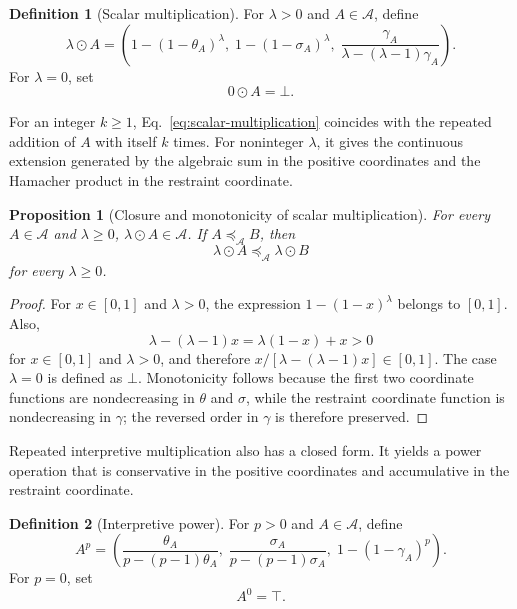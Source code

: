 \documentclass[reqno,final]{amsart}
\theoremstyle{definition}
\newtheorem{definition}{Definition}
\theoremstyle{plain}
\newtheorem{proposition}{Proposition}
\theoremstyle{remark}
\providecommand{\cA}{\mathcal{A}}
\providecommand{\preceqA}{\preceq_{\mathcal A}}
\begin{document}
\begin{definition}[Scalar multiplication]
\label{def:scalar-multiplication}
For \(\lambda>0\) and \(A\in\cA\), define
\begin{equation}
\lambda\odot A
=
\left(
1-(1-\theta_A)^\lambda,
\;1-(1-\sigma_A)^\lambda,
\;\frac{\gamma_A}{\lambda-(\lambda-1)\gamma_A}
\right).
\label{eq:scalar-multiplication}
\end{equation}
For \(\lambda=0\), set
\[
0\odot A=\bot.
\]
\end{definition}

For an integer \(k\ge1\), Eq.~\eqref{eq:scalar-multiplication} coincides with the repeated addition of \(A\) with itself \(k\) times. For noninteger \(\lambda\), it gives the continuous extension generated by the algebraic sum in the positive coordinates and the Hamacher product in the restraint coordinate.

\begin{proposition}[Closure and monotonicity of scalar multiplication]
\label{prop:scalar-multiplication-closure}
For every \(A\in\cA\) and \(\lambda\ge0\), \(\lambda\odot A\in\cA\). If \(A\preceqA B\), then
\[
\lambda\odot A\preceqA \lambda\odot B
\]
for every \(\lambda\ge0\).
\end{proposition}

\begin{proof}
For \(x\in[0,1]\) and \(\lambda>0\), the expression \(1-(1-x)^\lambda\) belongs to \([0,1]\). Also,
\[
\lambda-(\lambda-1)x=\lambda(1-x)+x>0
\]
for \(x\in[0,1]\) and \(\lambda>0\), and therefore \(x/[\lambda-(\lambda-1)x]\in[0,1]\). The case \(\lambda=0\) is defined as \(\bot\). Monotonicity follows because the first two coordinate functions are nondecreasing in \(\theta\) and \(\sigma\), while the restraint coordinate function is nondecreasing in \(\gamma\); the reversed order in \(\gamma\) is therefore preserved.
\end{proof}

Repeated interpretive multiplication also has a closed form. It yields a power operation that is conservative in the positive coordinates and accumulative in the restraint coordinate.

\begin{definition}[Interpretive power]
\label{def:interpretive-power}
For \(p>0\) and \(A\in\cA\), define
\begin{equation}
A^p
=
\left(
\frac{\theta_A}{p-(p-1)\theta_A},
\;\frac{\sigma_A}{p-(p-1)\sigma_A},
\;1-(1-\gamma_A)^p
\right).
\label{eq:interpretive-power}
\end{equation}
For \(p=0\), set
\[
A^0=\top.
\]
\end{definition}
\end{document}
